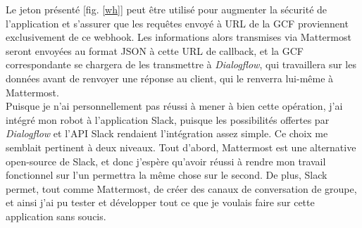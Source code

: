 \documentclass[stage2a]{tnreport} %
\begin{document}
\vspace{\linewidth}
Le jeton présenté [fig. \ref{wh}] peut être utilisé pour augmenter la sécurité de l'application et s'assurer que les requêtes envoyé à URL de la GCF proviennent exclusivement de ce webhook. Les informations alors transmises via Mattermost seront envoyées au format JSON à cette URL de callback, et la GCF correspondante se chargera de les transmettre à \emph{Dialogflow}, qui travaillera sur les données avant de renvoyer une réponse au client, qui le renverra lui-même à Mattermost.\\

Puisque je n'ai personnellement pas réussi à mener à bien cette opération, j'ai intégré mon robot à l'application Slack, puisque les possibilités offertes par \emph{Dialogflow} et l'API Slack rendaient l'intégration assez simple. Ce choix me semblait pertinent à deux niveaux. Tout d'abord, Mattermost est une alternative open-source de Slack, et donc j'espère qu'avoir réussi à rendre mon travail fonctionnel sur l'un permettra la même chose sur le second. De plus, Slack permet, tout comme Mattermost, de créer des canaux de conversation de groupe, et ainsi j'ai pu tester et développer tout ce que je voulais faire sur cette application sans soucis. \\ 
\end{document}
